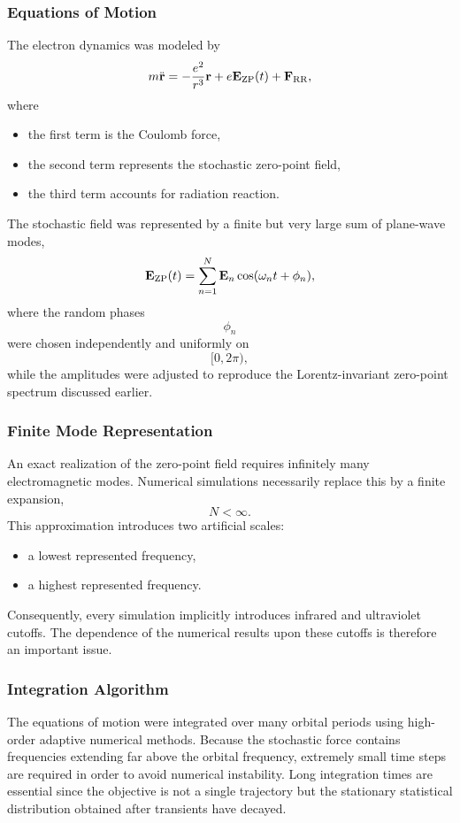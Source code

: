 \subsubsection{Equations of Motion}
The electron dynamics was modeled by
\begin{equation}
m\ddot{\mathbf r}=-\frac{e^2}{r^3}{\mathbf r}+e{\mathbf E}_{\rm ZP}(t)
    +{\mathbf F}_{\rm RR},
\label{eq:ColeZouEq}
\end{equation}
where
\begin{itemize}
\item the first term is the Coulomb force,
\item the second term represents the stochastic zero-point field,
\item the third term accounts for radiation reaction.
\end{itemize}
The stochastic field was represented by a finite but very large sum of
plane-wave modes,
\begin{equation}
{\mathbf E}_{\rm ZP}(t)=\sum_{n=1}^{N}{\mathbf E}_n\cos(\omega_nt+\phi_n),
\end{equation}
where the random phases
\[\phi_n\]
were chosen independently and uniformly on
\[[0,2\pi),\]
while the amplitudes were adjusted to reproduce the Lorentz-invariant
zero-point spectrum discussed earlier.
\subsubsection{Finite Mode Representation}
An exact realization of the zero-point field requires infinitely many
electromagnetic modes. Numerical simulations necessarily replace this by
a finite expansion,
\[N<\infty.\]
This approximation introduces two artificial scales:
\begin{itemize}
\item a lowest represented frequency,
\item a highest represented frequency.
\end{itemize}
Consequently, every simulation implicitly introduces infrared and
ultraviolet cutoffs.
The dependence of the numerical results upon these cutoffs is therefore
an important issue.
\subsubsection{Integration Algorithm}
The equations of motion were integrated over many orbital periods using
high-order adaptive numerical methods.
Because the stochastic force contains frequencies extending far above
the orbital frequency, extremely small time steps are required in order
to avoid numerical instability.
Long integration times are essential since the objective is not a single
trajectory but the stationary statistical distribution obtained after
transients have decayed.
